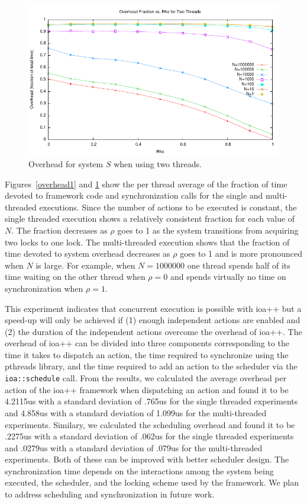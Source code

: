 \begin{figure}
\center
\includegraphics[width=\textwidth]{overhead2}
\caption{Overhead for system $S$ when using two threads.\label{overhead2}}
\end{figure}

Figures~\ref{overhead1} and \ref{overhead2} show the per thread average of the fraction of time devoted to framework code and synchronization calls for the single and multi-threaded executions.
Since the number of actions to be executed is constant, the single threaded execution shows a relatively consistent fraction for each value of $N$.
The fraction decreases as $\rho$ goes to 1 as the system transitions from acquiring two locks to one lock.
The multi-threaded execution shows that the fraction of time devoted to system overhead decreases as $\rho$ goes to 1 and is more pronounced when $N$ is large.
For example, when $N=1000000$ one thread spends half of its time waiting on the other thread when $\rho = 0$ and spends virtually no time on synchronization when $\rho = 1$.

This experiment indicates that concurrent execution is possible with ioa++ but a speed-up will only be achieved if (1) enough independent actions are enabled and (2) the duration of the independent actions overcome the overhead of ioa++.
The overhead of ioa++ can be divided into three components corresponding to the time it takes to dispatch an action, the time required to synchronize using the pthreads library, and the time required to add an action to the scheduler via the \verb+ioa::schedule+ call.
From the results, we calculated the average overhead per action of the ioa++ framework when dispatching an action and found it to be 4.2115us with a standard deviation of .765us for the single threaded experiments and 4.858us with a standard deviation of 1.099us for the multi-threaded experiments.
Similary, we calculated the scheduling overhead and found it to be .2275us with a standard deviation of .062us for the single threaded experiments and .0279us with a standard deviation of .079us for the multi-threaded experiments.
Both of these can be improved with better scheduler design.
The synchronization time depends on the interactions among the system being executed, the scheduler, and the locking scheme used by the framework.
We plan to address scheduling and synchronization in future work.
